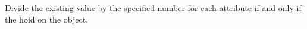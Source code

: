 Divide the existing value by the specified number for each attribute if and only
if the  hold on the object.



